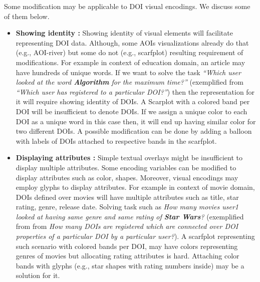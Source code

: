 Some modification may be applicable to DOI visual encodings. We discuss some of them below. 
\begin{itemize}
	\item \textbf{Showing identity :} Showing identity of visual elements will facilitate representing DOI data. Although, some AOIs visualizations already do that (e.g., AOI-river) but some do not (e.g., scarfplot) resulting requirement of modifications. For example in context of education domain, an article may have hundreds of unique words. If we want to solve the task \textit{``Which user looked at the word \textbf{Algorithm} for the maximum time?''} (exemplified from \textit{``Which user has registered to a particular DOI?''}) then the representation for it will require showing identity of DOIs. A Scarplot with a colored band per DOI will be insufficient to denote DOIs. If we assign a unique color to each DOI as a unique word in this case then, it will end up having similar color for two different DOIs. A possible modification can be done by adding a balloon with labels of DOIs attached to respective bands in the scarfplot.
	\item \textbf{Displaying attributes :} Simple textual overlays might be insufficient to display multiple attributes.  Some encoding variables can be modified to display attributes such as color, shapes. Moreover, visual encodings may employ glyphs to display attributes. For example in context of movie domain, DOIs defined over movies will have multiple attributes such as title, star rating, genre, release date. Solving task such as \textit{How many movies user1 looked at having same genre and same rating of \textbf{Star Wars}?} (exemplified from from \textit{How many DOIs are registered which are connected over DOI properties of a particular DOI by a particular user?}). A scarfplot representing such scenario with colored bands per DOI, may have colors representing genres of movies but allocating rating attributes is hard. Attaching color bands with glyphs (e.g., star shapes with rating numbers inside) may be a solution for it.

\end{itemize}
